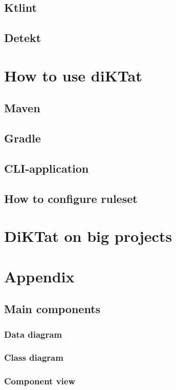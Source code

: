 \documentclass[12pt]{article}
\begin{document}
\subsection{Ktlint}
\subsection{Detekt}
\newpage

\section{How to use diKTat}
\subsection{Maven}

\subsection{Gradle}

\subsection{CLI-application}

\subsection{How to configure ruleset}

\newpage

\section{DiKTat on big projects}

\newpage
\section{Appendix}
\subsection{Main components}
\subsubsection{Data diagram}
\subsubsection{Class diagram}
\subsubsection{Component view}
\end{document}
